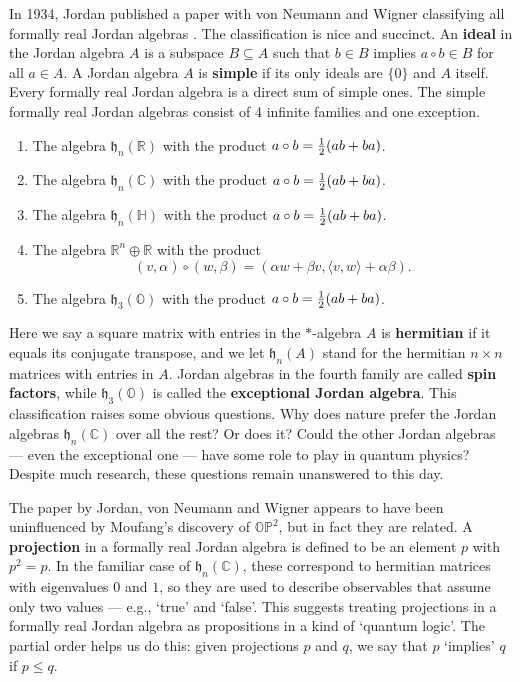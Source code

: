 \documentclass[12pt]{article}
\newcommand\R{{\mathbb R}}
\newcommand\C{{\mathbb C}}
\renewcommand\H{{\mathbb H}}
\renewcommand\O{{\mathbb O}}
\newcommand\OP{{\mathbb {OP}}}
\newcommand{\h}{{\mathfrak {h}}}
\begin{document}
In 1934, Jordan published a paper with von Neumann and Wigner  
classifying all formally real Jordan algebras \cite{JNW}.  The 
classification is nice and succinct.  An {\bf ideal} in the Jordan algebra 
$A$ is a subspace $B \subseteq A$ such that $b \in B$ implies $a \circ b 
\in B$ for all $a \in A$.  A Jordan algebra $A$ is {\bf simple} if its 
only ideals are $\{0\}$ and $A$ itself.  Every formally real Jordan 
algebra is a direct sum of simple ones.  The simple formally real Jordan 
algebras consist of 4 infinite families and one exception.   
\begin{enumerate} 
\item The algebra $\h_n(\R)$  
with the product $a \circ b = {1\over 2}(ab + ba)$.   
\item The algebra $\h_n(\C)$  
with the product $a \circ b = {1\over 2}(ab + ba)$.   
\item The algebra $\h_n(\H)$  
with the product $a \circ b = {1\over 2}(ab + ba)$.   
\item The algebra $\R^n \oplus \R$ with the product  
\[  (v,\alpha) \circ (w, \beta) =  
(\alpha w + \beta v, \langle v,w\rangle + \alpha \beta).  \] 
\item The algebra $\h_3(\O)$  
with the product $a \circ b = {1\over 2}(ab + ba)$.   
\end{enumerate} 
Here we say a square matrix with entries in the $\ast$-algebra $A$ is 
{\bf hermitian} if it equals its conjugate transpose, and we let 
$\h_n(A)$ stand for the hermitian $n \times n$ matrices with entries in 
$A$.  Jordan algebras in the fourth family are called {\bf spin 
factors}, while $\h_3(\O)$ is called the {\bf exceptional Jordan 
algebra}.  This classification raises some obvious questions.  Why does 
nature prefer the Jordan algebras $\h_n(\C)$ over all the rest?  Or does 
it?  Could the other Jordan algebras --- even the exceptional one --- 
have some role to play in quantum physics?  Despite much research, these 
questions remain unanswered to this day. 
 
The paper by Jordan, von Neumann and Wigner appears to have been 
uninfluenced by Moufang's discovery of $\OP^2$, but in fact they are 
related.  A {\bf projection} in a formally real Jordan algebra is 
defined to be an element $p$ with $p^2 = p$.  In the familiar case of 
$\h_n(\C)$, these correspond to hermitian matrices with eigenvalues $0$ 
and $1$, so they are used to describe observables that assume only two 
values --- e.g., `true' and `false'.  This suggests treating projections 
in a formally real Jordan algebra as propositions in a kind of `quantum 
logic'.  The partial order helps us do this: given projections $p$ and 
$q$, we say that $p$ `implies' $q$ if $p \le q$.    
 
\end{document}
